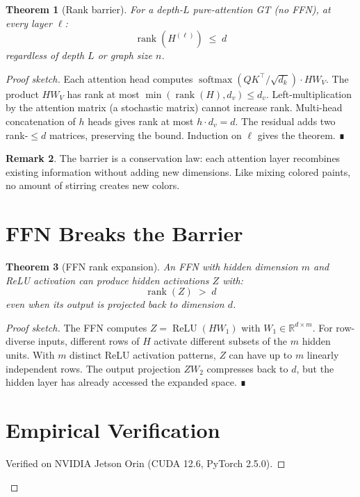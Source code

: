 \documentclass[11pt,a4paper]{amsart}
\theoremstyle{plain}
\newtheorem{theorem}{Theorem}[section]
\theoremstyle{definition}
\newtheorem{remark}[theorem]{Remark}
\begin{document}
\begin{theorem}[Rank barrier]\label{thm:barrier}
For a depth-$L$ pure-attention GT (no FFN), at every layer $\ell$:
\[
\operatorname{rank}(H^{(\ell)}) \;\leq\; d
\]
regardless of depth $L$ or graph size $n$.
\end{theorem}

\begin{proof}[Proof sketch]
Each attention head computes $\operatorname{softmax}(QK^\top/\sqrt{d_k})
\cdot H W_V$. The product $H W_V$ has rank at most $\min(\operatorname{rank}(H), d_v)
\leq d_v$. Left-multiplication by the attention matrix (a stochastic
matrix) cannot increase rank. Multi-head concatenation of $h$ heads
gives rank at most $h \cdot d_v = d$. The residual adds two
rank-$\leq d$ matrices, preserving the bound. Induction on $\ell$
gives the theorem. ∎

\begin{remark}
The barrier is a conservation law: each attention layer recombines
existing information without adding new dimensions. Like mixing colored
paints, no amount of stirring creates new colors.
\end{remark}

\section{FFN Breaks the Barrier}

\begin{theorem}[FFN rank expansion]\label{thm:ffn}
An FFN with hidden dimension $m$ and ReLU activation can produce
hidden activations $Z$ with:
\[
\operatorname{rank}(Z) \;\gt\; d
\]
even when its output is projected back to dimension $d$.
\end{theorem}

\begin{proof}[Proof sketch]
The FFN computes $Z = \operatorname{ReLU}(H W_1)$ with $W_1 \in
\mathbb{R}^{d \times m}$. For row-diverse inputs, different rows of
$H$ activate different subsets of the $m$ hidden units. With $m$
distinct ReLU activation patterns, $Z$ can have up to $m$ linearly
independent rows. The output projection $Z W_2$ compresses back to
$d$, but the hidden layer has already accessed the expanded space. ∎

\section{Empirical Verification}

Verified on NVIDIA Jetson Orin (CUDA 12.6, PyTorch 2.5.0).


\end{proof}
\end{proof}
\end{document}
